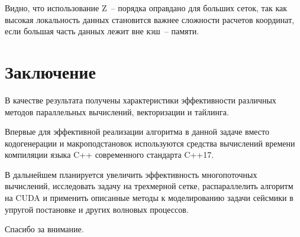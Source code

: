 \documentclass[18pt]{article}
\begin{document}
Видно, что использование Z~-- порядка оправдано для больших сеток, так как 
высокая локальность данных становится важнее сложности расчетов координат, 
если большая часть данных лежит вне кэш~-- памяти.

\section{Заключение}
\par
В качестве результата получены характеристики эффективности различных 
методов параллельных вычислений, векторизации и тайлинга.

Впервые для эффективной реализации алгоритма в данной задаче
вместо кодогенерации и макроподстановок используются средства вычислений
времени компиляции языка C++ современного стандарта C++17.

В дальнейшем планируется увеличить эффективность многопоточных вычислений, 
исследовать задачу на трехмерной сетке, распараллелить алгоритм на CUDA 
и применить описанные методы к моделированию задачи сейсмики 
в упругой постановке и других волновых процессов.

Спасибо за внимание.

\end{document}
